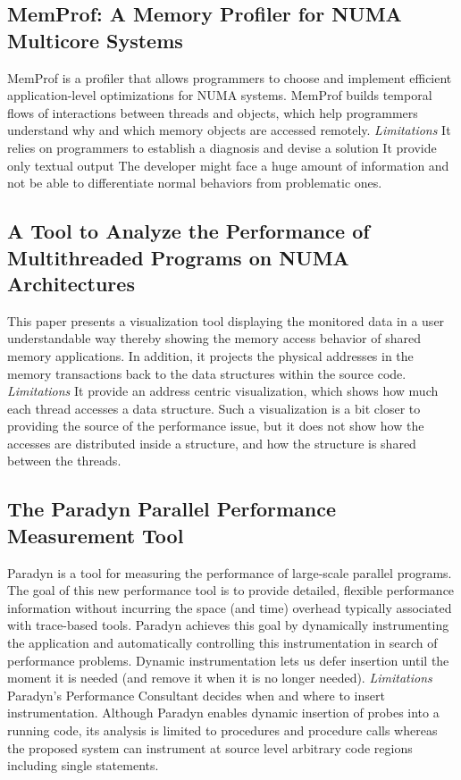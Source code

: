 \subsection{MemProf: A Memory Profiler for NUMA Multicore Systems}
MemProf is a profiler that allows programmers to choose and implement efficient application-level optimizations for NUMA systems. MemProf builds temporal flows of interactions between threads and objects, which help programmers understand why and which memory objects are accessed remotely.\newline
\textit{Limitations}\newline
It relies on programmers to establish a diagnosis and devise a solution
It provide only textual output
The developer might face a huge amount of information and not be able to differentiate normal behaviors from problematic ones.
\subsection{A Tool to Analyze the Performance of Multithreaded Programs on NUMA Architectures}
This paper presents a visualization tool displaying the monitored data in a user understandable way thereby showing the memory access behavior of shared memory applications. In addition, it projects the physical addresses in the memory transactions back to the data structures within the source code.\newline
\textit{Limitations}\newline
It provide an address centric visualization, which shows how much each thread accesses a data structure. Such a visualization is a bit closer to providing the source of the performance issue, but it does not show how the accesses are distributed inside a structure, and how the structure is shared between the threads.

\subsection{The Paradyn Parallel Performance Measurement Tool}
Paradyn is a tool for measuring the performance of large-scale parallel programs. The goal of this new performance tool is to provide detailed, flexible performance information without incurring the space (and time) overhead typically associated with trace-based tools. Paradyn achieves this goal by dynamically instrumenting the application and automatically controlling this instrumentation in search of performance problems. Dynamic instrumentation lets us defer insertion until the moment it is needed (and remove it when it is no longer needed).\newline
\textit{Limitations}\newline
Paradyn’s Performance Consultant decides when and where to insert instrumentation. Although Paradyn enables dynamic insertion of probes into a running code, its analysis is limited to procedures and procedure calls whereas the proposed system can instrument at source level arbitrary code regions including single statements.

